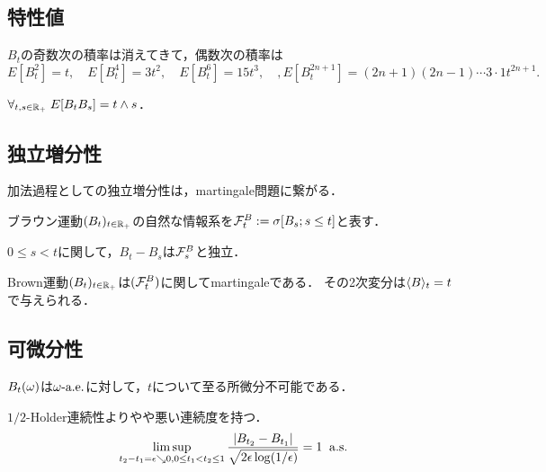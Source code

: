 \documentclass[uplatex,dvipdfmx]{jsreport}
\begin{document}
\subsection{特性値}

\begin{lemma}[積率]
    $B_t$の奇数次の積率は消えてきて，偶数次の積率は
    \[E[B_t^2]=t,\quad E[B_t^4]=3t^2,\quad E[B^6_t]=15t^3,\quad,E[B^{2n+1}_t]=(2n+1)(2n-1)\cdots 3\cdot 1t^{2n+1}.\]
\end{lemma}

\begin{lemma}[共分散]
    $\forall_{t,s\in\mathbb{R}_+}\;E[B_tB_s]=t\land s$．
\end{lemma}

\subsection{独立増分性}

\begin{tcolorbox}[colframe=ForestGreen, colback=ForestGreen!10!white,breakable,colbacktitle=ForestGreen!40!white,coltitle=black,fonttitle=\bfseries\sffamily,
title=]
    加法過程としての独立増分性は，martingale問題に繋がる．
\end{tcolorbox}

\begin{notation}
    ブラウン運動$(B_t)_{t\in\mathbb{R}_+}$の自然な情報系を$\mathcal{F}^B_t:=\sigma[B_s;s\le t]$と表す．
\end{notation}

\begin{proposition}
    $0\le s<t$に関して，$B_t-B_s$は$\mathcal{F}_s^B$と独立．
\end{proposition}

\begin{corollary}
    Brown運動$(B_t)_{t\in\mathbb{R}_+}$は$(\mathcal{F}^B_t)$に関してmartingaleである．
    その2次変分は$\langle B\rangle_t=t$で与えられる．
\end{corollary}

\subsection{可微分性}

\begin{theorem}
    $B_t(\omega)$は$\omega\text{-a.e.}$に対して，$t$について至る所微分不可能である．
\end{theorem}

\begin{theorem}
    $1/2$-Holder連続性よりやや悪い連続度を持つ．
    \[\limsup_{t_2-t_1=\epsilon\searrow0,0\le t_1<t_2\le1}\frac{\lvert B_{t_2}-B_{t_1}\rvert}{\sqrt{2\epsilon\log(1/\epsilon)}}=1\;\;\mathrm{a.s.}\]
\end{theorem}
\end{document}
